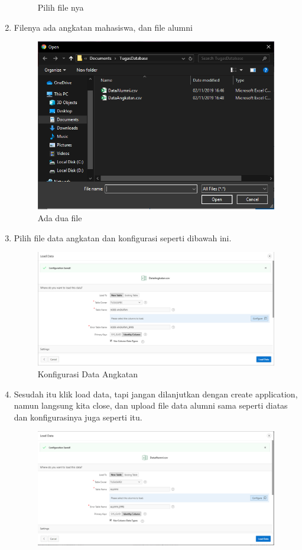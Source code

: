 \documentclass{article}
\begin{document}
\begin{enumerate}
\begin{figure}[!htbp]
        \caption{Pilih file nya}
    \end{figure}
    \item Filenya ada angkatan mahasiswa, dan file alumni
    \begin{figure}[!htbp]
        \centering
        \includegraphics[scale=0.5]{13.PNG}
        \caption{Ada dua file}
    \end{figure}
\newpage
    \item Pilih file data angkatan dan konfigurasi seperti dibawah ini.
    \begin{figure}[!htbp]
        \centering
        \includegraphics[scale=0.3]{14.PNG}
        \caption{Konfigurasi Data Angkatan}
    \end{figure}
    \item Sesudah itu klik load data, tapi jangan dilanjutkan dengan create application, namun langsung kita close, dan upload file data alumni sama seperti diatas dan konfigurasinya juga seperti itu.
    \begin{figure}[!htbp]
        \centering
        \includegraphics[scale=0.3]{15.PNG}

\end{figure}
\end{enumerate}
\end{document}
